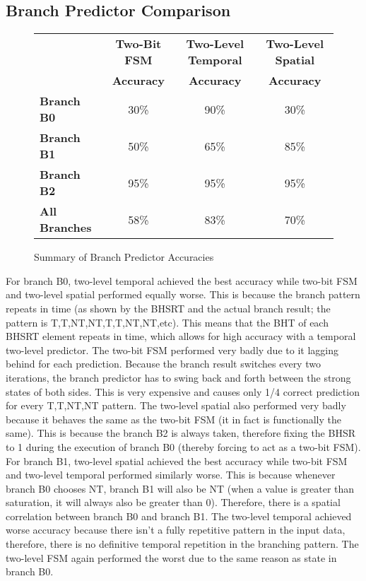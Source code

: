 \documentclass[10pt]{article}
\begin{document}
\subsection{Branch Predictor Comparison}

\begin{figure}[H]
\centering
{\setlength{\tabcolsep}{3pt}
\begin{tabular}{lccc}
\hline
& \textbf{Two-Bit FSM} & \textbf{Two-Level Temporal} & \textbf{Two-Level Spatial} \\
& \textbf{Accuracy} & \textbf{Accuracy} & \textbf{Accuracy} \\ \hline
\textbf{Branch B0}    & 30\%& 90\%& 30\%\\ \hline
\textbf{Branch B1}    & 50\%& 65\%& 85\%\\ \hline
\textbf{Branch B2}    & 95\%& 95\%& 95\%\\ \hline
\textbf{All Branches} & 58\%& 83\%& 70\%\\ \hline
\end{tabular}
}
\caption{Summary of Branch Predictor Accuracies}
\end{figure}

For branch B0, two-level temporal achieved the best accuracy while two-bit FSM and two-level spatial performed equally worse. This is because the branch pattern repeats in time (as shown by the BHSRT and the actual branch result; the pattern is T,T,NT,NT,T,T,NT,NT,etc). This means that the BHT of each BHSRT element repeats in time, which allows for high accuracy with a temporal two-level predictor. The two-bit FSM performed very badly due to it lagging behind for each prediction. Because the branch result switches every two iterations, the branch predictor has to swing back and forth between the strong states of both sides. This is very expensive and causes only 1/4 correct prediction for every T,T,NT,NT pattern. The two-level spatial also performed very badly because it behaves the same as the two-bit FSM (it in fact is functionally the same). This is because the branch B2 is always taken, therefore fixing the BHSR to 1 during the execution of branch B0 (thereby forcing to act as a two-bit FSM).\\

For branch B1, two-level spatial achieved the best accuracy while two-bit FSM and two-level temporal performed similarly worse. This is because whenever branch B0 chooses NT, branch B1 will also be NT (when a value is greater than saturation, it will always also be greater than 0). Therefore, there is a spatial correlation between branch B0 and branch B1. The two-level temporal achieved worse accuracy because there isn't a fully repetitive pattern in the input data, therefore, there is no definitive temporal repetition in the branching pattern. The two-level FSM again performed the worst due to the same reason as state in branch B0.\\
\end{document}
